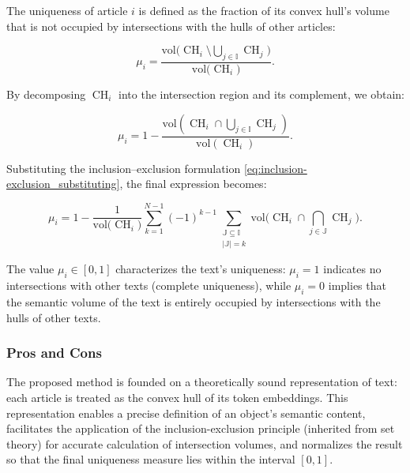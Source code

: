 The uniqueness of article $i$ is defined as the fraction of its convex hull's volume that is not occupied by intersections with the hulls of other articles:

\begin{equation}
    \mu_i = \frac{\mathrm{vol}\Big( \operatorname{CH}_i \setminus \bigcup_{j \in \mathbb{I}} \operatorname{CH}_j\Big)}{\mathrm{vol}\Big( \operatorname{CH}_i\Big)}.
\end{equation}

By decomposing $\operatorname{CH}_i$ into the intersection region and its complement, we obtain:

\begin{equation}
    \mu_i = 1 - \frac{\mathrm{vol}\left(\operatorname{CH}_i \cap \bigcup_{j \in \mathbb{I}}\operatorname{CH}_j\right)}{\mathrm{vol}\left(\operatorname{CH}_i\right)}.
\end{equation}

Substituting the inclusion--exclusion formulation \ref{eq:inclusion-exclusion_substituting}, the final expression becomes:

\begin{equation}\label{eq:uniqueness}
    \mu_i = 1 - \frac{1}{\mathrm{vol}\big(\operatorname{CH}_i\big)}
    \sum_{k=1}^{N-1} (-1)^{k-1} \sum_{\substack{\mathbb{J} \subseteq \mathbb{I} \\ |\mathbb{J}| = k}}
    \mathrm{vol}\Big(\operatorname{CH}_i \cap \bigcap_{j \in \mathbb{J}}\operatorname{CH}_j\Big).
\end{equation}

The value $\mu_i \in [0, 1]$ characterizes the text's uniqueness: $\mu_i = 1$ indicates no intersections with other texts (complete uniqueness),
while $\mu_i = 0$ implies that the semantic volume of the text is entirely occupied by intersections with the hulls of other texts.

\subsubsection{Pros and Cons}
The proposed method is founded on a theoretically sound representation of text: each article is treated as the convex hull of its token embeddings.
This representation enables a precise definition of an object's semantic content, facilitates the application of the inclusion-exclusion principle
(inherited from set theory) for accurate calculation of intersection volumes, and normalizes the result so that the final uniqueness measure
lies within the interval $[0,1]$.

